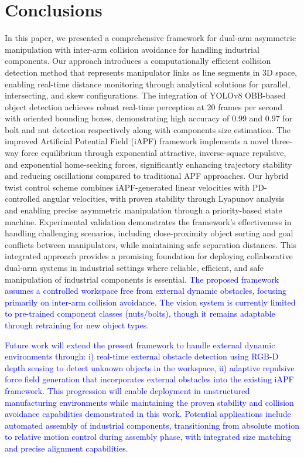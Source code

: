 \documentclass[utf8]{FrontiersinHarvard}
\begin{document}
\section{Conclusions}
\label{conclusion}
In this paper, we presented a comprehensive framework for dual-arm asymmetric manipulation with inter-arm collision avoidance for handling industrial components. Our approach introduces a computationally efficient collision detection method that represents manipulator links as line segments in 3D space, enabling real-time distance monitoring through analytical solutions for parallel, intersecting, and skew configurations. The integration of YOLOv8 OBB-based object detection achieves robust real-time perception at 20 frames per second with oriented bounding boxes, demonstrating high accuracy of 0.99 and 0.97 for bolt and nut detection respectively along with components size estimation. The improved Artificial Potential Field (iAPF) framework implements a novel three-way force equilibrium through exponential attractive, inverse-square repulsive, and exponential home-seeking forces, significantly enhancing trajectory stability and reducing oscillations compared to traditional APF approaches. Our hybrid twist control scheme combines iAPF-generated linear velocities with PD-controlled angular velocities, with proven stability through Lyapunov analysis and enabling precise asymmetric manipulation through a priority-based state machine. Experimental validation demonstrates the framework's effectiveness in handling challenging scenarios, including close-proximity object sorting and goal conflicts between manipulators, while maintaining safe separation distances. This integrated approach provides a promising foundation for deploying collaborative dual-arm systems in industrial settings where reliable, efficient, and safe manipulation of industrial components is essential. \textcolor{blue}{The proposed framework assumes a controlled workspace free from external dynamic obstacles, focusing primarily on inter-arm collision avoidance. The vision system is currently limited to pre-trained component classes (nuts/bolts), though it remains adaptable through retraining for new object types.}

\textcolor{blue}{Future work will extend the present framework to handle external dynamic environments through: i) real-time external obstacle detection using RGB-D depth sensing to detect unknown objects in the workspace, ii) adaptive repulsive force field generation that incorporates external obstacles into the existing iAPF framework. This progression will enable deployment in unstructured manufacturing environments while maintaining the proven stability and collision avoidance capabilities demonstrated in this work. Potential applications include automated assembly of industrial components, transitioning from absolute motion to relative motion control during assembly phase, with integrated size matching and precise alignment capabilities. }
\end{document}
